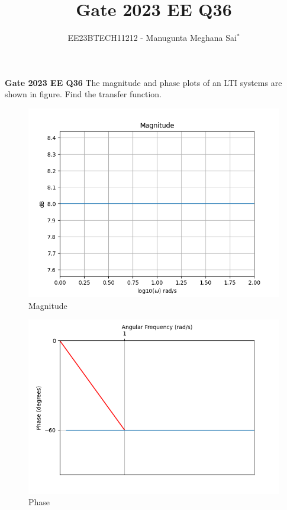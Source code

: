 \documentclass[journal,12pt,twocolumn]{IEEEtran}
\theoremstyle{remark}
\begin{document}
    
    
    \vspace{3cm}
    
    \title{Gate 2023 EE Q36}
    \author{EE23BTECH11212 - Manugunta Meghana Sai$^{*}$%
    }
    \maketitle
    \newpage
    \bigskip
    
    \renewcommand{\thefigure}{\theenumi}
    \renewcommand{\thetable}{\theenumi}
    
    \vspace{3cm}
    \textbf{Gate 2023 EE Q36} 
    The magnitude and phase plots of an LTI systems are shown in figure. Find the transfer function.\\
    \begin{figure}[h!]
        \centering
        \includegraphics[width=\columnwidth]{figs/gain_plot.png}
        \caption{Magnitude}
        \label{fig:1ee36}
    \end{figure}
    
    \begin{figure}[h!]
        \centering
        \includegraphics[width=\columnwidth]{figs/graph2.png}
        \caption{Phase}
        \label{fig:2ee36}
    \end{figure}
    
\end{document}
